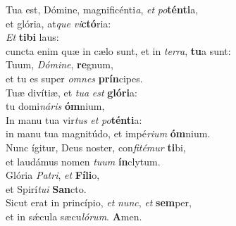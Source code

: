 \evenverse Tua est, Dómine, magnificénti\textit{a}, \textit{et} \textit{po}\textbf{tén}\textbf{ti}a,~\*\\
\evenverse et glória, at\textit{que} \textit{vi}\textbf{ctó}ria:\\
\oddverse \textit{Et} \textbf{ti}\textbf{bi} laus:~\*\\
\oddverse cuncta enim quæ in cælo sunt, et in \textit{ter}\textit{ra}, \textbf{tu}a sunt:\\
\evenverse Tuum, \textit{Dó}\textit{mi}\textit{ne}, \textbf{re}gnum,~\*\\
\evenverse et tu es super \textit{om}\textit{nes} \textbf{prín}cipes.\\
\oddverse Tuæ divítiæ, et \textit{tu}\textit{a} \textit{est} \textbf{gló}\textbf{ri}a:~\*\\
\oddverse tu domi\textit{ná}\textit{ris} \textbf{óm}nium,\\
\evenverse In manu tua vir\textit{tus} \textit{et} \textit{po}\textbf{tén}\textbf{ti}a:~\*\\
\evenverse in manu tua magnitúdo, et impé\textit{ri}\textit{um} \textbf{óm}nium.\\
\oddverse Nunc ígitur, Deus noster, con\textit{fi}\textit{té}\textit{mur} \textbf{ti}bi,~\*\\
\oddverse et laudámus nomen \textit{tu}\textit{um} \textbf{ín}clytum.\\
\evenverse Glória \textit{Pa}\textit{tri}, \textit{et} \textbf{Fí}\textbf{li}o,~\*\\
\evenverse et Spirí\textit{tu}\textit{i} \textbf{San}cto.\\
\oddverse Sicut erat in princípio, \textit{et} \textit{nunc}, \textit{et} \textbf{sem}per,~\*\\
\oddverse et in sǽcula sæcu\textit{ló}\textit{rum}. \textbf{A}men.\\
